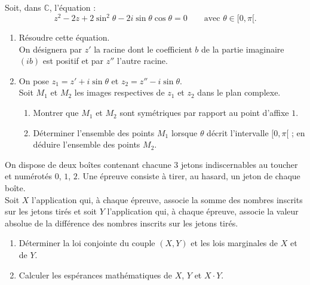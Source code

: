 \documentclass{axiobac}
\begin{document}
\entete

\begin{exercice}{}

Soit, dans $\mathbb{C}$, l'équation :
\[
z^2 - 2z + 2\sin^2\theta - 2i\sin\theta\cos\theta = 0 \qquad \text{avec } \theta \in [0, \pi[ .
\]

\begin{enumerate}
    \item Résoudre cette équation. \\
    On désignera par $z'$ la racine dont le coefficient $b$ de la partie imaginaire $(ib)$ est positif et par $z''$ l'autre racine.
    \item On pose $z_1 = z' + i\sin\theta$ et $z_2 = z'' - i\sin\theta$. \\
    Soit $M_1$ et $M_2$ les images respectives de $z_1$ et $z_2$ dans le plan complexe.
    \begin{enumerate}
        \item Montrer que $M_1$ et $M_2$ sont symétriques par rapport au point d'affixe $1$.
        \item Déterminer l'ensemble des points $M_1$ lorsque $\theta$ décrit l'intervalle $[0, \pi[$ ; en déduire l'ensemble des points $M_2$.
    \end{enumerate}
\end{enumerate}

\end{exercice}

\begin{exercice}{}
\horsprogramme

On dispose de deux boîtes contenant chacune $3$ jetons indiscernables au toucher et numérotés $0$, $1$, $2$. Une épreuve consiste à tirer, au hasard, un jeton de chaque boîte. \\
Soit $X$ l'application qui, à chaque épreuve, associe la somme des nombres inscrits sur les jetons tirés et soit $Y$ l'application qui, à chaque épreuve, associe la valeur absolue de la différence des nombres inscrits sur les jetons tirés.

\begin{enumerate}
    \item Déterminer la loi conjointe du couple $(X, Y)$ et les lois marginales de $X$ et de $Y$.
    \item Calculer les espérances mathématiques de $X$, $Y$ et $X \cdot Y$.
\end{enumerate}

\end{exercice}
\end{document}
